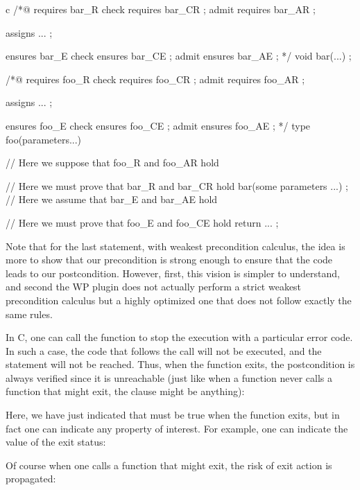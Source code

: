 \begin{CodeBlock}{c}
/*@       requires bar_R
    check requires bar_CR ;
    admit requires bar_AR ;

    assigns ... ;

          ensures bar_E
    check ensures bar_CE ;
    admit ensures bar_AE ;
*/
void bar(...) ;

/*@       requires foo_R
    check requires foo_CR ;
    admit requires foo_AR ;

    assigns ... ;

          ensures foo_E
    check ensures foo_CE ;
    admit ensures foo_AE ;
*/
type foo(parameters...){
  // Here we suppose that foo_R and foo_AR hold


  // Here we must prove that bar_R and bar_CR hold
  bar(some parameters ...) ;
  // Here we assume that bar_E and bar_AE hold


  // Here we must prove that foo_E and foo_CE hold
  return ... ;
}
\end{CodeBlock}


Note that for the last statement, with weakest precondition calculus, the idea
is more to show that our precondition is strong enough to ensure that the code
leads to our postcondition. However, first, this vision is simpler to
understand, and second the WP plugin does not actually perform a strict weakest
precondition calculus but a highly optimized one that does not follow exactly
the same rules.




In C, one can call the  function to stop the execution with a
particular error code. In such a case, the code that follows the call will not
be executed, and the  statement will not be reached. Thus,
when the function exits, the postcondition is always verified since it is
unreachable (just like when a function never calls a function that might exit,
the  clause might be anything):




Here, we have just indicated that  must be true
when the function exits, but in fact one can indicate any property of interest.
For example, one can indicate the value of the exit status:




Of course when one calls a function that might exit, the risk of exit action is
propagated:


